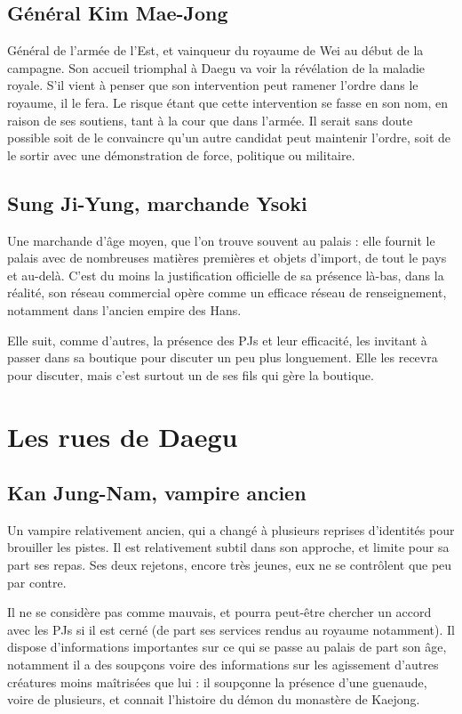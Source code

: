 \documentclass[10pt,a4paper]{book}
\begin{document}
\subsection{Général Kim Mae-Jong}
Général de l'armée de l'Est, et vainqueur du royaume de Wei au début de la campagne. Son accueil triomphal à Daegu va voir la révélation de la maladie royale. S'il vient à penser que son intervention peut ramener l'ordre dans le royaume, il le fera. Le risque étant que cette intervention se fasse en son nom, en raison de ses soutiens, tant à la cour que dans l'armée. Il serait sans doute possible soit de le convaincre qu'un autre candidat peut maintenir l'ordre, soit de le sortir avec une démonstration de force, politique ou militaire.
\subsection{Sung Ji-Yung, marchande Ysoki}
Une marchande d'âge moyen, que l'on trouve souvent au palais : elle fournit le palais avec de nombreuses matières premières et objets d'import, de tout le pays et au-delà. C'est du moins la justification officielle de sa présence là-bas, dans la réalité, son réseau commercial opère comme un efficace réseau de renseignement, notamment dans l'ancien empire des Hans.

Elle suit, comme d'autres, la présence des PJs et leur efficacité, les invitant à passer dans sa boutique pour discuter un peu plus longuement. Elle les recevra pour discuter, mais c'est surtout un de ses fils qui gère la boutique.
\section{Les rues de Daegu}
\subsection{Kan Jung-Nam, vampire ancien}
Un vampire relativement ancien, qui a changé à plusieurs reprises d'identités pour brouiller les pistes. Il est relativement subtil dans son approche, et limite pour sa part ses repas. Ses deux rejetons, encore très jeunes, eux ne se contrôlent que peu par contre.

Il ne se considère pas comme mauvais, et pourra peut-être chercher un accord avec les PJs si il est cerné (de part ses services rendus au royaume notamment). Il dispose d'informations importantes sur ce qui se passe au palais de part son âge, notamment il a des soupçons voire des informations sur les agissement d'autres créatures moins maîtrisées que lui : il soupçonne la présence d'une guenaude, voire de plusieurs, et connait l'histoire du démon du monastère de Kaejong.
\end{document}
